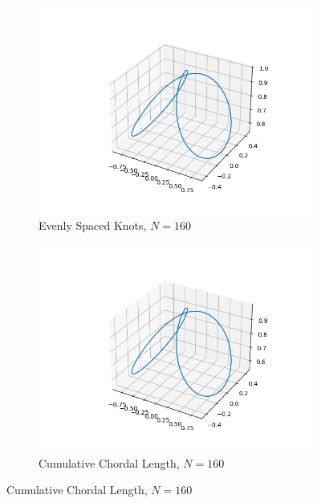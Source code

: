 \documentclass[a4paper]{article}
\begin{document}
\begin{figure}[H]
    \centering
    \begin{subfigure}[b]{0.45\textwidth}
        \centering
        \includegraphics[width=\textwidth]{../figure/E_3_PPBallProj160.png}
        \caption{Evenly Spaced Knots, $N=160$}
    \end{subfigure}
    \begin{subfigure}[b]{0.45\textwidth}
        \centering
        \includegraphics[width=\textwidth]{../figure/E_3_PPBallProj_cum160.png}
        \caption{Cumulative Chordal Length, $N=160$}
    \end{subfigure}
\end{figure}
\end{document}
